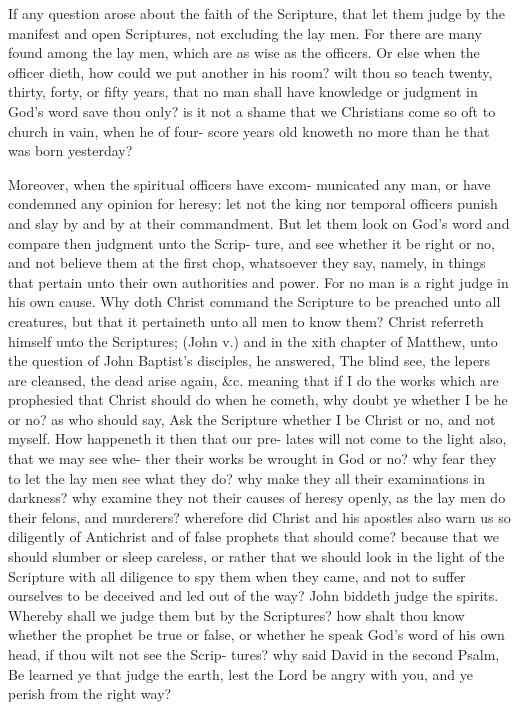 \documentclass{custom}
\begin{document}
If any question arose about the faith of the Scripture, that 
let them judge by the manifest and open Scriptures, not 
excluding the lay men. For there are many found among 
the lay men, which are as wise as the officers. Or else 
when the officer dieth, how could we put another in his 
room? wilt thou so teach twenty, thirty, forty, or fifty 
years, that no man shall have knowledge or judgment in 
God's word save thou only? is it not a shame that we 
Christians come so oft to church in vain, when he of four- 
score years old knoweth no more than he that was born 
yesterday? 

Moreover, when the spiritual officers have excom- 
municated any man, or have condemned any opinion for 
heresy: let not the king nor temporal officers punish and 
slay by and by at their commandment. But let them look 
on God's word and compare then judgment unto the Scrip- 
ture, and see whether it be right or no, and not believe 
them at the first chop, whatsoever they say, namely, in 
things that pertain unto their own authorities and power. 
For no man is a right judge in his own cause. Why doth 
Christ command the Scripture to be preached unto all 
creatures, but that it pertaineth unto all men to know 
them? Christ referreth himself unto the Scriptures; (John 
v.) and in the xith chapter of Matthew, unto the question 
of John Baptist's disciples, he answered, The blind see, the 
lepers are cleansed, the dead arise again, &c. meaning that 
if I do the works which are prophesied that Christ should 
do when he cometh, why doubt ye whether I be he or no? 
as who should say, Ask the Scripture whether I be Christ or 
no, and not myself. How happeneth it then that our pre- 
lates will not come to the light also, that we may see whe- 
ther their works be wrought in God or no? why fear they 
to let the lay men see what they do? why make they all their 
examinations in darkness? why examine they not their 
causes of heresy openly, as the lay men do their felons, and 
murderers? wherefore did Christ and his apostles also 
warn us so diligently of Antichrist and of false prophets 
that should come? because that we should slumber or 
sleep careless, or rather that we should look in the light of 
the Scripture with all diligence to spy them when they came, 
and not to suffer ourselves to be deceived and led out of the 
way? John biddeth judge the spirits. Whereby shall we 
judge them but by the Scriptures? how shalt thou know 
whether the prophet be true or false, or whether he speak 
God's word of his own head, if thou wilt not see the Scrip- 
tures? why said David in the second Psalm, Be learned ye 
that judge the earth, lest the Lord be angry with you, and 
ye perish from the right way?
\end{document}

